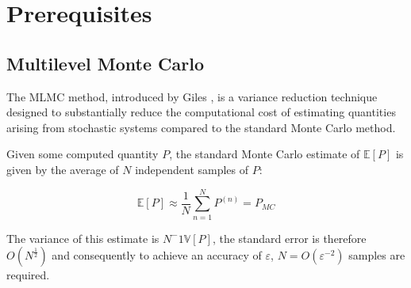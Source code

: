 \section{Prerequisites}

\subsection{Multilevel Monte Carlo}

The MLMC method, introduced by Giles \cite{giles2015multilevel}, is a variance reduction technique
designed to substantially reduce the computational cost of estimating quantities arising from stochastic systems
compared to the standard Monte Carlo method.

Given some computed quantity $P$, the standard Monte Carlo estimate of $\mathbb{E}\left[P\right]$ 
is given by the average of $N$ independent samples of $P$:

\begin{equation*}
    \mathbb{E}\left[P\right] \approx \frac{1}{N} \sum_{n=1}^{N} P^{(n)} = P_{MC}
\end{equation*}

The variance of this estimate is $N^-1 \mathbb{V}\left[P\right]$, the standard error is therefore 
$O(N^{\frac{1}{2}})$ and consequently to achieve an accuracy of $\varepsilon$, $N = O(\varepsilon^{-2})$ samples 
are required. 

